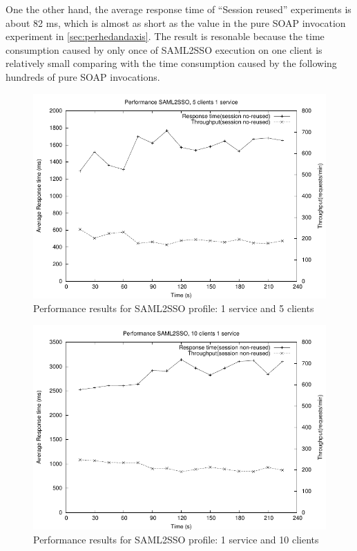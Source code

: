 \documentclass[conference]{IEEEtran}
\begin{document}
One the other hand, the average response time of ``Session reused'' experiments is about 82 ms,
which is almost as short as the value in the pure SOAP invocation experiment in \ref{sec:perhedandaxis}.
The result is resonable because the time consumption caused by only once of SAML2SSO execution on one 
client is relatively small comparing with the time consumption caused by the following hundreds 
of pure SOAP invocations.

\begin{figure}
\includegraphics[width=0.9\columnwidth]{SAML2SSO_thread5.pdf}
\caption{Performance results for SAML2SSO profile: 1 service and 5 clients}
\label{fig:SAML2SSO_thread5}
\end{figure}

\begin{figure}
\includegraphics[width=0.9\columnwidth]{SAML2SSO_thread10.pdf}
\caption{Performance results for SAML2SSO profile: 1 service and 10 clients}
\label{fig:SAML2SSO_thread10}
\end{figure}
\end{document}
